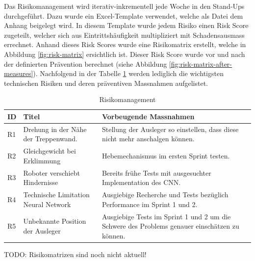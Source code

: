 Das Risikomanagement wird iterativ-inkrementell jede Woche in den Stand-Ups durchgeführt. Dazu wurde ein Excel-Template verwendet, welche als Datei dem Anhang beigelegt wird. In diesem Template wurde jedem Risiko einen Risk Score zugeteilt, welcher sich aus Eintrittshäufigkeit multipliziert mit Schadensausmass errechnet. Anhand dieses Risk Scores wurde eine Risikomatrix erstellt, welche in Abbildung \ref{fig:risk-matrix} ersichtlich ist. Dieser Risk Score wurde vor und nach der definierten Prävention berechnet (siehe Abbildung \ref{fig:risk-matrix-after-measures}). Nachfolgend in der Tabelle \ref{tab:risikomanagement} werden lediglich die wichtigsten technischen Risiken und deren präventiven Massnahmen aufgelistet. 

\begin{center}
\begin{table}[H]
    \begin{tabularx}{\textwidth}{|l|X|X|}
        \hline
        \textbf{ID} & \textbf{Titel} & \textbf{Vorbeugende Massnahmen} \\ \hline
        R1 & Drehung in der Nähe der Treppenwand. & Stellung der Ausleger so einstellen, dass diese nicht mehr anschalgen können. \\ \hline
        R2 & Gleichgewicht bei Erklimmung & Hebemechanismus im ersten Sprint testen. \\ \hline
        R3 & Roboter verschiebt Hindernisse & Bereits frühe Tests mit ausgesuchter Implementation des CNN. \\ \hline 
        R4 & Technische Limitation Neural Network & Ausgiebige Recherche und Tests bezüglich Performance im Sprint 1 und 2.\\ \hline
        R5 & Unbekannte Position der Ausleger & Ausgiebige Tests im Sprint 1 und 2 um die Schwere des Problems genauer einschätzen zu können. \\ \hline
    \end{tabularx}
    \caption{Risikomanagement}
    \label{tab:risikomanagement}
\end{table}
\end{center}

TODO: Risikomatrizen sind noch nicht aktuell!

